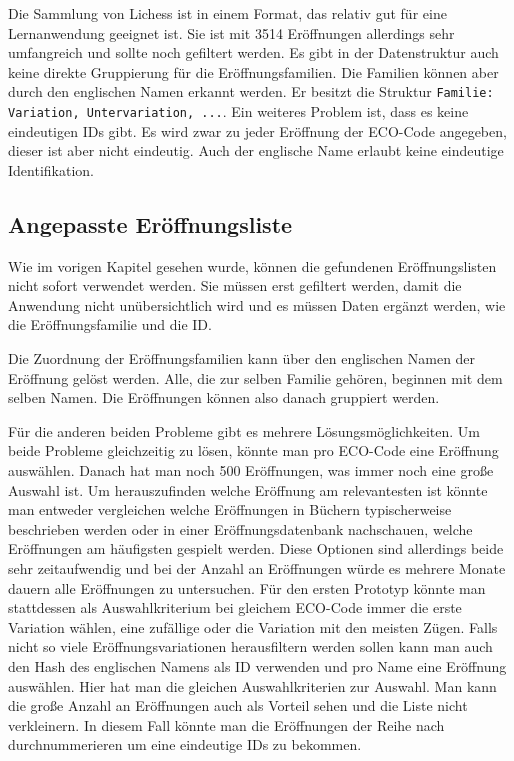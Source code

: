 Die Sammlung von Lichess ist in einem Format, das relativ gut für eine Lernanwendung geeignet ist. Sie ist mit 3514 Eröffnungen allerdings sehr umfangreich und sollte noch gefiltert werden. Es gibt in der Datenstruktur auch keine direkte Gruppierung für die Eröffnungsfamilien. Die Familien können aber durch den englischen Namen erkannt werden. Er besitzt die Struktur \lstinline{Familie: Variation, Untervariation, ...}. Ein weiteres Problem ist, dass es keine eindeutigen IDs gibt. Es wird zwar zu jeder Eröffnung der ECO-Code angegeben, dieser ist aber nicht eindeutig. Auch der englische Name erlaubt keine eindeutige Identifikation. 

\subsection{Angepasste Eröffnungsliste}
\label{cp:opening list}
Wie im vorigen Kapitel gesehen wurde, können die gefundenen Eröffnungslisten nicht sofort verwendet werden. Sie müssen erst gefiltert werden, damit die Anwendung nicht unübersichtlich wird und es müssen Daten ergänzt werden, wie die Eröffnungsfamilie und die ID.

Die Zuordnung der Eröffnungsfamilien kann über den englischen Namen der Eröffnung gelöst werden. Alle, die zur selben Familie gehören, beginnen mit dem selben Namen. Die Eröffnungen können also danach gruppiert werden.

Für die anderen beiden Probleme gibt es mehrere Lösungsmöglichkeiten. Um beide Probleme gleichzeitig zu lösen, könnte man pro ECO-Code eine Eröffnung auswählen. Danach hat man noch 500 Eröffnungen, was immer noch eine große Auswahl ist. Um herauszufinden welche Eröffnung am relevantesten ist könnte man entweder vergleichen welche Eröffnungen in Büchern typischerweise beschrieben werden oder in einer Eröffnungsdatenbank nachschauen, welche Eröffnungen am häufigsten gespielt werden. Diese Optionen sind allerdings beide sehr zeitaufwendig und bei der Anzahl an Eröffnungen würde es mehrere Monate dauern alle Eröffnungen zu untersuchen. Für den ersten Prototyp könnte man stattdessen als Auswahlkriterium bei gleichem ECO-Code immer die erste Variation wählen, eine zufällige oder die Variation mit den meisten Zügen. Falls nicht so viele Eröffnungsvariationen herausfiltern werden sollen kann man auch den Hash des englischen Namens als ID verwenden und pro Name eine Eröffnung auswählen. Hier hat man die gleichen Auswahlkriterien zur Auswahl. Man kann die große Anzahl an Eröffnungen auch als Vorteil sehen und die Liste nicht verkleinern. In diesem Fall könnte man die Eröffnungen der Reihe nach durchnummerieren um eine eindeutige IDs zu bekommen.
